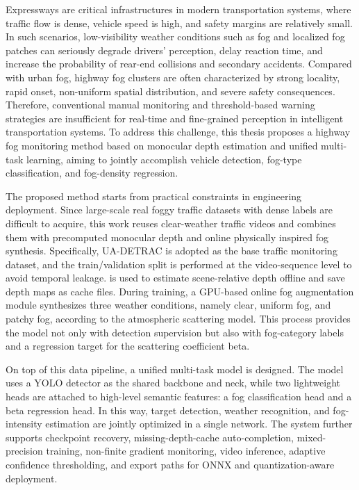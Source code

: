 Expressways are critical infrastructures in modern transportation systems, where traffic flow is dense, vehicle speed is high, and safety margins are relatively small. In such scenarios, low-visibility weather conditions such as fog and localized fog patches can seriously degrade drivers’ perception, delay reaction time, and increase the probability of rear-end collisions and secondary accidents. Compared with urban fog, highway fog clusters are often characterized by strong locality, rapid onset, non-uniform spatial distribution, and severe safety consequences. Therefore, conventional manual monitoring and threshold-based warning strategies are insufficient for real-time and fine-grained perception in intelligent transportation systems. To address this challenge, this thesis proposes a highway fog monitoring method based on monocular depth estimation and unified multi-task learning, aiming to jointly accomplish vehicle detection, fog-type classification, and fog-density regression.

The proposed method starts from practical constraints in engineering deployment. Since large-scale real foggy traffic datasets with dense labels are difficult to acquire, this work reuses clear-weather traffic videos and combines them with precomputed monocular depth and online physically inspired fog synthesis. Specifically, UA-DETRAC is adopted as the base traffic monitoring dataset, and the train/validation split is performed at the video-sequence level to avoid temporal leakage.  is used to estimate scene-relative depth offline and save depth maps as cache files. During training, a GPU-based online fog augmentation module synthesizes three weather conditions, namely clear, uniform fog, and patchy fog, according to the atmospheric scattering model. This process provides the model not only with detection supervision but also with fog-category labels and a regression target for the scattering coefficient beta.

On top of this data pipeline, a unified multi-task model is designed. The model uses a YOLO detector as the shared backbone and neck, while two lightweight heads are attached to high-level semantic features: a fog classification head and a beta regression head. In this way, target detection, weather recognition, and fog-intensity estimation are jointly optimized in a single network. The system further supports checkpoint recovery, missing-depth-cache auto-completion, mixed-precision training, non-finite gradient monitoring, video inference, adaptive confidence thresholding, and export paths for ONNX and quantization-aware deployment.

